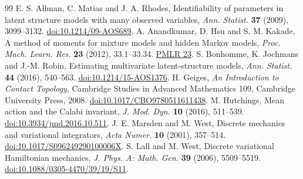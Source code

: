 \begin{thebibliography}{99}
E. S. Allman, C. Matias and J. A. Rhodes,
Identifiability of parameters in latent structure models with many observed
variables, \emph{Ann. Statist.} \textbf{37} (2009), 3099--3132.
\href{https://doi.org/10.1214/09-AOS689}{doi:10.1214/09-AOS689}.
A. Anandkumar, D. Hsu and S. M. Kakade,
A method of moments for mixture models and hidden Markov models,
\emph{Proc. Mach. Learn. Res.} \textbf{23} (2012), 33.1--33.34.
\href{https://proceedings.mlr.press/v23/anandkumar12.html}{PMLR 23}.
S. Bonhomme, K. Jochmans and J.-M. Robin,
Estimating multivariate latent-structure models,
\emph{Ann. Statist.} \textbf{44} (2016), 540--563.
\href{https://doi.org/10.1214/15-AOS1376}{doi:10.1214/15-AOS1376}.
H. Geiges, \emph{An Introduction to Contact Topology},
Cambridge Studies in Advanced Mathematics 109, Cambridge University Press, 2008.
\href{https://doi.org/10.1017/CBO9780511611438}{doi:10.1017/CBO9780511611438}.
M. Hutchings, Mean action and the Calabi invariant,
\emph{J. Mod. Dyn.} \textbf{10} (2016), 511--539.
\href{https://doi.org/10.3934/jmd.2016.10.511}{doi:10.3934/jmd.2016.10.511}.
J. E. Marsden and M. West,
Discrete mechanics and variational integrators,
\emph{Acta Numer.} \textbf{10} (2001), 357--514.
\href{https://doi.org/10.1017/S096249290100006X}{doi:10.1017/S096249290100006X}.
S. Lall and M. West,
Discrete variational Hamiltonian mechanics,
\emph{J. Phys. A: Math. Gen.} \textbf{39} (2006), 5509--5519.
\href{https://doi.org/10.1088/0305-4470/39/19/S11}{doi:10.1088/0305-4470/39/19/S11}.
\end{thebibliography}
